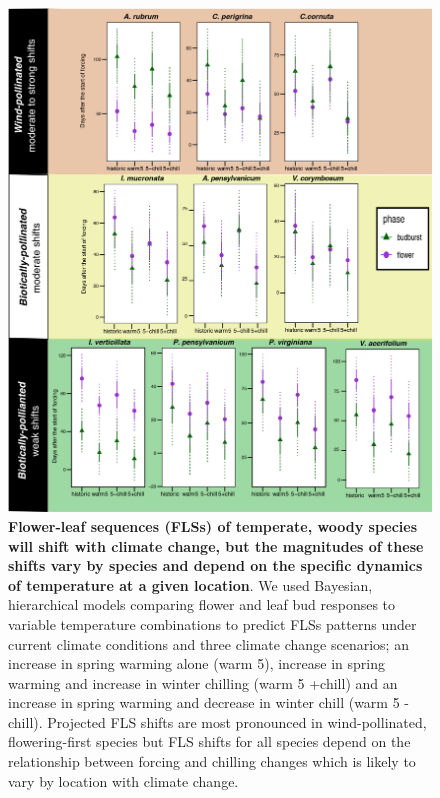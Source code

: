 \documentclass[11pt]{article}
\begin{document}
\begin{figure}[h!]
    \centering
 \includegraphics[width=\textwidth]{..//Plots/Flobuds_manuscript_figs/climpredictions.jpg}
    \caption{\textbf{Flower-leaf sequences (FLSs) of temperate, woody species will shift with climate change, but the magnitudes of these shifts vary by species and depend on the specific dynamics of temperature at a given location}. We used Bayesian, hierarchical models comparing flower and leaf bud responses to variable temperature combinations to predict FLSs patterns under current climate conditions and three climate change scenarios;  an increase in spring warming alone (warm 5), increase in spring warming and increase in winter chilling (warm 5 +chill) and an increase in spring warming and decrease in winter chill (warm 5 -chill). Projected FLS shifts are most pronounced in wind-pollinated, flowering-first species but FLS shifts for all species depend on the relationship between forcing and chilling changes which is likely to vary by location with climate change.}
    \label{fig:preddy}
\end{figure}
\end{document}
